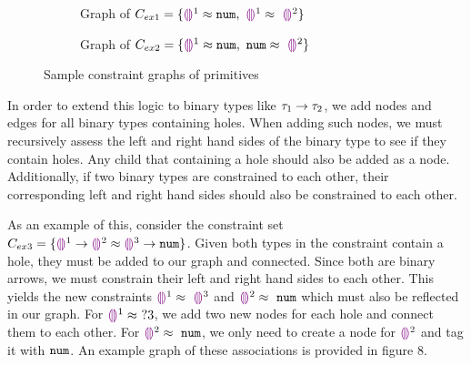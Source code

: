 \begin{figure}[htbp]
\centering
\begin{subfigure}{.39\textwidth}
  \centering
  \caption{Graph of $C_{ex1} = \{ \tehole^{1} \approx \tnum, ~ \tehole^{1} \approx~ \tehole^{2}\}$}
  \label{fig:sub1}
\end{subfigure}
\begin{subfigure}{.39\textwidth}
  \centering
  \caption{Graph of $C_{ex2} = \{ \tehole^{1} \approx \tnum, ~ \tnum \approx~ \tehole^{2}\}$}
  \label{fig:sub2}
\end{subfigure}
\caption{Sample constraint graphs of primitives}
\label{fig:test}
\end{figure}

In order to extend this logic to binary types like $\tarr{\tau_1}{\tau_2}$, we add nodes and edges for all binary types containing holes. When adding such nodes, we must recursively assess the left and right hand sides of the binary type to see if they contain holes. Any child that containing a hole should also be added as a node. Additionally, if two binary types are constrained to each other, their corresponding left and right hand sides should also be constrained to each other.

As an example of this, consider the constraint set $C_{ex3} = \{ \tarr{\tehole^{1}}{\tehole^{2}} \approx \tarr{\tehole^{3}}{\tnum}  \}$.
Given both types in the constraint contain a hole, they must be added to our graph and connected. Since both are binary arrows, we must constrain their left and right hand sides to each other. This yields the new constraints $\tehole^{1} \approx~ \tehole^{3}$ and $\tehole^{2} \approx~ \tnum$ which must also be reflected in our graph. For $\tehole^{1} \approx~ ?3$, we add two new nodes for each hole and connect them to each other. For $\tehole^{2} \approx~ \tnum$, we only need to create a node for $\tehole^{2}$ and tag it with $\tnum$. An example graph of these associations is provided in figure 8.

